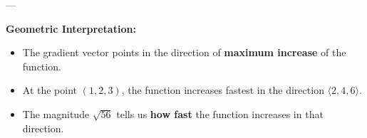 \begin{examplebox}
    ---

    \textbf{Geometric Interpretation:}
    \begin{itemize}
        \item The gradient vector points in the direction of \textbf{maximum increase} of the function.
        \item At the point $(1,2,3)$, the function increases fastest in the direction $\langle 2,4,6 \rangle$.
        \item The magnitude $\sqrt{56}$ tells us \textbf{how fast} the function increases in that direction.
    \end{itemize}

\end{examplebox}
